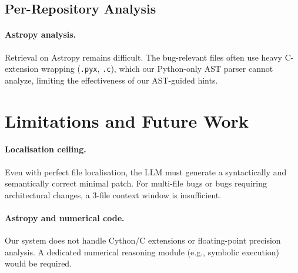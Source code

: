 \documentclass[11pt]{article}
\begin{document}
\subsection{Per-Repository Analysis}

\begin{table}[H]
\centering
\small
{}
\caption{Per-repository Recall@5. Astropy remains challenging due to C-extensions.}
\label{tab:per_repo}
\end{table}

\paragraph{Astropy analysis.}
Retrieval on Astropy remains difficult. The bug-relevant files often use heavy
C-extension wrapping (\texttt{.pyx}, \texttt{.c}), which our Python-only AST
parser cannot analyze, limiting the effectiveness of our AST-guided hints.

\section{Limitations and Future Work}

\paragraph{Localisation ceiling.}
Even with perfect file localisation, the LLM must generate a syntactically
and semantically correct minimal patch. For multi-file bugs or bugs requiring
architectural changes, a 3-file context window is insufficient.

\paragraph{Astropy and numerical code.}
Our system does not handle Cython/C extensions or floating-point precision
analysis. A dedicated numerical reasoning module (e.g., symbolic execution)
would be required.
\end{document}
